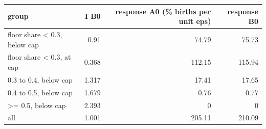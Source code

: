 \begin{tabular}{lrrr}
\toprule
group & I B0 & response A0 (\% births per unit eps) & response B0 \\
\midrule
floor share < 0.3, below cap & 0.91 & 74.79 & 75.73 \\
floor share < 0.3, at cap & 0.368 & 112.15 & 115.94 \\
0.3 to 0.4, below cap & 1.317 & 17.41 & 17.65 \\
0.4 to 0.5, below cap & 1.679 & 0.76 & 0.77 \\
>= 0.5, below cap & 2.393 & 0 & 0 \\
all & 1.001 & 205.11 & 210.09 \\
\bottomrule
\end{tabular}
